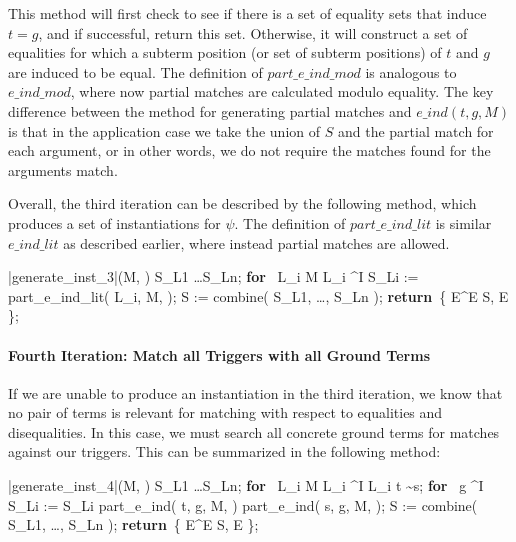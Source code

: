 \documentclass{llncs}
\def\RETURN{\keyword{return}\ }
\def\ENDPROC{\untab}
\def\DOFOR{\qtab\keyword{for}\ }
\def\ENDFOR{\untab}
\def\keyword#1{\mbox{\normalshape\bf #1}}
\begin{document}
This method will first check to see if there is a set of equality sets that induce $t = g$, and if successful, return this set.
Otherwise, it will construct a set of equalities for which a subterm position (or set of subterm positions) of $t$ and $g$ are induced to be equal.
The definition of $part\_e\_ind\_mod$ is analogous to $e\_ind\_mod$, where now partial matches are calculated modulo equality.
The key difference between the method for generating partial matches and $e\_ind( t, g, M )$ is that in the application case we take the union of $S$ and the partial match for each argument, or in other words, we do not require the matches found for the arguments match.

Overall, the third iteration can be described by the following method, which produces a set of instantiations for $\psi$.
The definition of $part\_e\_ind\_lit$ is similar $e\_ind\_lit$ as described earlier, where instead partial matches are allowed.

\begin{minipage}[t]{.4\linewidth}
\begin{program}
\PROC |generate\_inst_3|(M, \psi) \BODY
S_{L1} \ldots S_{Ln};
\DOFOR {} L_i \in M  L_i \mapsto^I \psi
  S_{Li} := part\_e\_ind\_lit( L_i, M, \psi );
\ENDFOR
S := combine( S_{L1}, \ldots, S_{Ln} );
\RETURN \{ E^\varepsilon \mid E \in S, E  \};
\ENDPROC
\end{program}
\end{minipage}

\paragraph{Fourth Iteration: Match all Triggers with all Ground Terms}

If we are unable to produce an instantiation in the third iteration, we know that no pair of terms is relevant for matching with respect to equalities and disequalities.
In this case, we must search all concrete ground terms for matches against our triggers.
This can be summarized in the following method:

\begin{minipage}[t]{.4\linewidth}
\begin{program}
\PROC |generate\_inst_4|(M, \psi) \BODY
S_{L1} \ldots S_{Ln};
\DOFOR {} L_i \in M  L_i \mapsto^I \psi
  L_i  t \sim s;
  \DOFOR {} g \mapsto^I \emptyset
    S_{Li} := S_{Li} \cup part\_e\_ind( t, g, M, \psi ) \cup part\_e\_ind( s, g, M, \psi );
  \ENDFOR
\ENDFOR
S := combine( S_{L1}, \ldots, S_{Ln} );
\RETURN \{ E^\varepsilon \mid E \in S, E  \};
\ENDPROC
\end{program}
\end{minipage}
\end{document}
